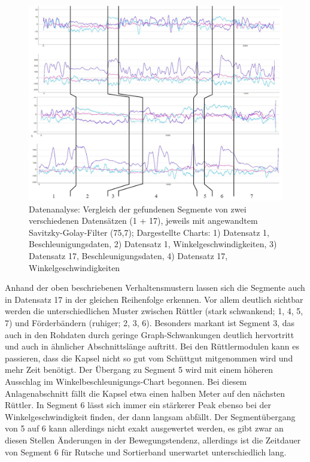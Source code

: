 \begin{figure}[htb]
	\centering
	\includegraphics[width=1\linewidth]{images/k5-segmente_vergleich.JPG}
	\caption{Datenanalyse: Vergleich der gefundenen Segmente von zwei verschiedenen Datensätzen (1 + 17), jeweils mit angewandtem Savitzky-Golay-Filter (75,7); Dargestellte Charts: 1) Datensatz 1, Beschleunigungsdaten, 2) Datensatz 1, Winkelgeschwindigkeiten, 3) Datensatz 17, Beschleunigungsdaten, 4) Datensatz 17, Winkelgeschwindigkeiten}
	\label{fig:k5_segmente_vergleich}
\end{figure}

Anhand der oben beschriebenen Verhaltensmustern lassen sich die Segmente auch in Datensatz 17 in der gleichen Reihenfolge erkennen. Vor allem deutlich sichtbar werden die unterschiedlichen Muster zwischen Rüttler (stark schwankend; 1, 4, 5, 7) und Förderbändern (ruhiger; 2, 3, 6). Besonders markant ist Segment 3, das auch in den Rohdaten durch geringe Graph-Schwankungen deutlich hervortritt und auch in ähnlicher Abschnittslänge auftritt. Bei den Rüttlermodulen kann es passieren, dass die Kapsel nicht so gut vom Schüttgut mitgenommen wird und mehr Zeit benötigt. Der Übergang zu Segment 5 wird mit einem höheren Ausschlag im Winkelbeschleunigungs-Chart begonnen. Bei diesem Anlagenabschnitt fällt die Kapsel etwa einen halben Meter auf den nächsten Rüttler. In Segment 6 lässt sich immer ein stärkerer Peak ebenso bei der Winkelgeschwindigkeit finden, der dann langsam abfällt.
Der Segmentübergang von 5 auf 6 kann allerdings nicht exakt ausgewertet werden, es gibt zwar an diesen Stellen Änderungen in der Bewegungstendenz, allerdings ist die Zeitdauer von Segment 6 für Rutsche und Sortierband unerwartet unterschiedlich lang. 

